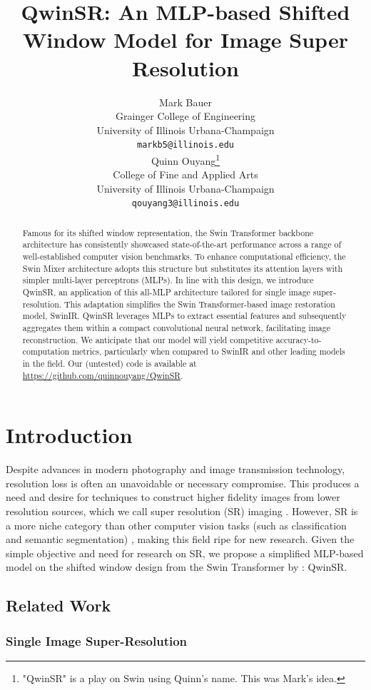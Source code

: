 \documentclass{article}
\title{QwinSR: An MLP-based Shifted Window Model for Image Super Resolution}
\author{
  Mark Bauer \\
  Grainger College of Engineering\\
  University of Illinois Urbana-Champaign\\
  \texttt{markb5@illinois.edu} \\
  \And
  Quinn Ouyang\thanks{"QwinSR" is a play on Swin using Quinn's name. This was Mark's idea.} \\
  College of Fine and Applied Arts \\
  University of Illinois Urbana-Champaign \\
  \texttt{qouyang3@illinois.edu} \\
}
\begin{document}
\maketitle

\begin{abstract}
    Famous for its shifted window representation, the Swin Transformer backbone architecture has consistently showcased state-of-the-art performance across a range of well-established computer vision benchmarks. To enhance computational efficiency, the Swin Mixer architecture adopts this structure but substitutes its attention layers with simpler multi-layer perceptrons (MLPs). In line with this design, we introduce QwinSR, an application of this all-MLP architecture tailored for single image super-resolution. This adaptation simplifies the Swin Transformer-based image restoration model, SwinIR. QwinSR leverages MLPs to extract essential features and subsequently aggregates them within a compact convolutional neural network, facilitating image reconstruction. We anticipate that our model will yield competitive accuracy-to-computation metrics, particularly when compared to SwinIR and other leading models in the field. Our (untested) code is available at \url{https://github.com/quinnouyang/QwinSR}.
\end{abstract}

\section{Introduction}

Despite advances in modern photography and image transmission technology, resolution loss is often an unavoidable or necessary compromise. This produces a need and desire for techniques to construct higher fidelity images from lower resolution sources, which we call super resolution (SR) imaging \citep{Overview, ESRGAN}. However, SR is a more niche category than other computer vision tasks (such as classification and semantic segmentation) \citep{PapersWithCode}, making this field ripe for new research. Given the simple objective and need for research on SR, we propose a simplified MLP-based model on the shifted window design from the Swin Transformer by \citet{SwinTransformer}: QwinSR.

\subsection{Related Work}

\subsubsection{Single Image Super-Resolution}
\end{document}
